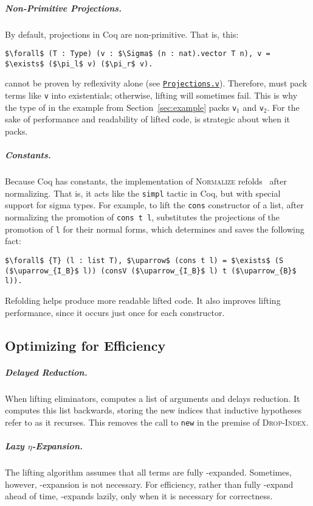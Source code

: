 \subparagraph*{Non-Primitive Projections.} By default, projections in Coq are non-primitive. That is, this:
\begin{lstlisting}
$\forall$ (T : Type) (v : $\Sigma$ (n : nat).vector T n), v = $\exists$ ($\pi_l$ v) ($\pi_r$ v).
\end{lstlisting}
cannot be proven by reflexivity alone (see \href{http://github.com/uwplse/ornamental-search/blob/itp+equiv/plugin/coq/examples/Projections.v}{\lstinline{Projections.v}}).
Therefore, \toolnameb must pack terms like \lstinline{v} into existentials; otherwise, lifting
will sometimes fail. This is why the type of  
in the example from Section~\ref{sec:example} packs \lstinline{v}$_1$ and \lstinline{v}$_2$.
For the sake of performance and readability of lifted code, \toolnameb is strategic about when it packs.

\subparagraph*{Constants.}
Because Coq has constants, the implementation of \textsc{Normalize} 
refolds~\cite{boutillier:tel-01054723} after normalizing.
That is, it acts like the \lstinline{simpl}
tactic in Coq, but with special support for sigma types.
For example, to lift the \lstinline{cons} constructor of a list, after normalizing the promotion of \lstinline{cons t l},
\toolnameb substitutes the projections of the promotion of \lstinline{l} for their normal forms,
which determines and saves the following fact:
\begin{lstlisting}
$\forall$ {T} (l : list T), $\uparrow$ (cons t l) = $\exists$ (S ($\uparrow_{I_B}$ l)) (consV ($\uparrow_{I_B}$ l) t ($\uparrow_{B}$ l)).
\end{lstlisting}
Refolding helps produce more readable lifted code.
It also improves lifting performance,
since it occurs just once for each constructor.

\subsection{Optimizing for Efficiency}
\label{sec:opteff}

\subparagraph*{Delayed Reduction.}
When lifting eliminators, \toolnameb computes a list of arguments and delays reduction.
It computes this list backwards, storing the new indices that inductive hypotheses
refer to as it recurses. This removes the call to \lstinline{new} in the premise of \textsc{Drop-Index}.

\subparagraph*{Lazy $\eta$-Expansion.}
The lifting algorithm assumes that all terms are fully \smallmath{$\eta$}-expanded. Sometimes,
however, \smallmath{$\eta$}-expansion is not necessary.
For efficiency, rather than fully \smallmath{$\eta$}-expand ahead of time, \toolnameb \smallmath{$\eta$}-expands lazily, 
only when it is necessary for correctness.


